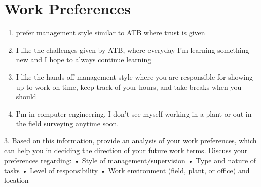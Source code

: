 \documentclass[letterpaper,12pt]{article}
\begin{document}
\section{Work Preferences}

\begin{enumerate}
 \item prefer management style similar to ATB where trust is given
 \item I like the challenges given by ATB, where everyday I'm learning something new and I hope
       to always continue learning
 \item I like the hands off management style where you are responsible for showing up to work on time, keep track of your hours,
       and take breaks when you should
 \item I'm in computer engineering, I don't see myself working in a plant or out in the field surveying anytime soon.
\end{enumerate}

3.	Based on this information, provide an analysis of your work preferences, which can help you in deciding the direction of your future work terms. Discuss your preferences regarding:
•	Style of management/supervision
•	Type and nature of tasks
•	Level of responsibility
•	Work environment (field, plant, or office) and location


\nocite{*}

\end{document}
